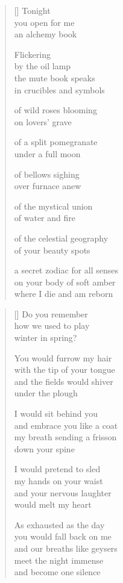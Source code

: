 \documentclass[12pt,a4paper]{article}
\begin{document}
\begin{verse}[\versewidth]
  Tonight \\
  you open for me \\
  an alchemy book

  Flickering \\
  by the oil lamp \\
  the mute book speaks \\
  in crucibles and symbols

  of wild roses blooming \\
  on lovers' grave

  of a split pomegranate \\
  under a full moon

  of bellows sighing \\
  over furnace anew

  of the mystical union \\
  of water and fire

  of the celestial geography \\
  of your beauty spots

  a secret zodiac for all senses \\
  on your body of soft amber \\
  where I die and am reborn

\end{verse}


\newpage

\poemtitle{}

\settowidth{\versewidth}{would meet night immense}

\bigskip

\begin{verse}[\versewidth]
  Do you remember \\
  how we used to play \\
  winter in spring?

  You would furrow my hair \\
  with the tip of your tongue \\
  and the fields would shiver \\
  under the plough

  I would sit behind you \\
  and embrace you like a coat \\
  my breath sending a frisson \\
  down your spine

  I would pretend to sled \\
  my hands on your waist \\
  and your nervous laughter \\
  would melt my heart

  As exhausted as the day \\
  you would fall back on me \\
  and our breaths like geysers \\
  meet the night immense \\
  and become one silence
\end{verse}
\end{document}
